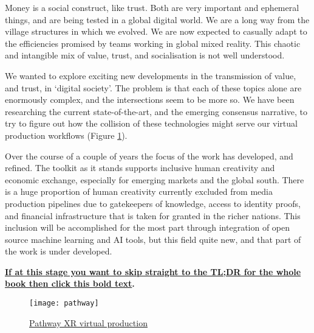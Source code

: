 Money is a social construct, like trust. Both are very important and ephemeral things, and are being tested in a global digital world.  We are a long way from the village structures in which we evolved. We are now expected to casually adapt to the efficiencies promised by teams working in global mixed reality. This chaotic and intangible mix of value, trust, and socialisation is not well understood.\par
We wanted to explore exciting new developments in the transmission of value, and trust, in `digital society'. The problem is that each of these topics alone are enormously complex, and the intersections seem to be more so. We have been researching the current state-of-the-art, and the emerging consensus narrative, to try to figure out how the collision of these technologies might serve our virtual production workflows (Figure \ref{fig:pathway}).\par
Over the course of a couple of years the focus of the work has developed, and refined. The toolkit as it stands supports inclusive human creativity and economic exchange, especially for emerging markets and the global south. There is a huge proportion of human creativity currently excluded from media production pipelines due to gatekeepers of knowledge, access to identity proofs, and financial infrastructure that is taken for granted in the richer nations. This inclusion will be accomplished for the most part through integration of open source machine learning and AI tools, but this field quite new, and that part of the work is under developed.\par

\textbf{\hyperref[sec:tldr]{If at this stage you want to skip straight to the TL;DR for the whole book then click this bold text}.}\par
\begin{figure}
  \centering
   \texttt{[image: pathway]}
 \caption{\href{https://www.pathwayxr.studio/}{Pathway XR virtual production}}
    \label{fig:pathway}
\end{figure}


